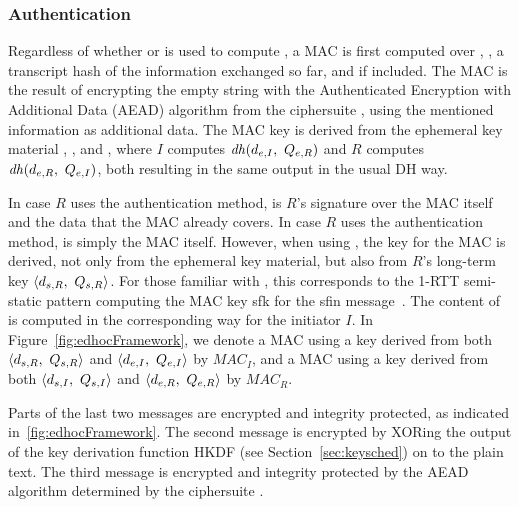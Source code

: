 \subsubsection{Authentication}
Regardless of whether \mStat{} or \mSig{} is used to compute \mAuthr{}, a
MAC is first computed over \mIdcredr{}, \mCredr{}, a transcript hash of the
information exchanged so far, and \mADtwo{} if included.
%
The MAC is the result of encrypting the empty string with the Authenticated
Encryption with Additional Data (AEAD) algorithm from the ciphersuite
\mSuites{}, using the mentioned information as additional data.
%
The MAC key is derived from the ephemeral key material
\mGx{}, \mGy{}, \mX{} and \mY{}, where $I$
computes $\mathit{dh}(d_{e,I},\ Q_{e,R})$ and $R$ computes $\mathit{dh}(d_{e,R},\ Q_{e,I})$, both resulting in
the same output in the usual DH way.
%

In case $R$ uses the \mSig{} authentication method, \mAuthr{} is $R$'s
signature over the MAC itself and the data that the MAC already covers.
%
In case $R$ uses the \mStat{} authentication method, \mAuthr{} is simply the
MAC itself.
%
However, when using \mStat{}, the key for the MAC is derived, not only from the
ephemeral key material, but also from $R$'s long-term key
$\langle\mPriv{R},\ \mPub{R}\rangle$.
%
For those familiar with \mOptls, this corresponds to the 1-RTT semi-static
pattern computing the MAC key \textsf{sfk} for the \textsf{sfin}
message~\cite{DBLP:conf/eurosp/KrawczykW16}.
%
The content of \mAuthi{} is computed in the corresponding way for the initiator
$I$.
%
In Figure~\ref{fig:edhocFramework}, we denote a MAC using a key derived from
both $\langle\mPriv{R},\ \mPub{R}\rangle$ and $\langle d_{e,I},\ Q_{e,I}\rangle$ by
$\mathit{MAC}_I$, and a MAC using a key derived from
both $\langle d_{s,I},\ Q_{s,I}\rangle$ and $\langle d_{e,R},\ Q_{e,R}\rangle$ by
$\mathit{MAC}_R$.
%

Parts of the last two messages are encrypted and integrity protected, as
indicated in~\ref{fig:edhocFramework}.
%
The second message is encrypted by XORing the output of the key derivation
function HKDF (see Section~\ref{sec:keysched}) on to the plain text.
%
The third message is encrypted and integrity protected by the AEAD algorithm
determined by the ciphersuite \mSuites{}.
%

